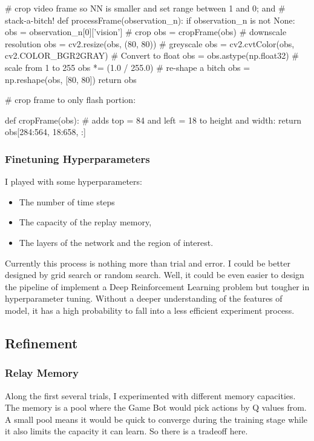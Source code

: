 \documentclass[a4paper]{article}
\begin{document}
\begin{python}
# crop video frame so NN is smaller and set range between 1 and 0; and
# stack-a-bitch!
def processFrame(observation_n):
    if observation_n is not None:
        obs = observation_n[0]['vision']
        # crop
        obs = cropFrame(obs)
        # downscale resolution
        obs = cv2.resize(obs, (80, 80))
        # greyscale
        obs = cv2.cvtColor(obs, cv2.COLOR_BGR2GRAY)
        # Convert to float
        obs = obs.astype(np.float32)
        # scale from 1 to 255
        obs *= (1.0 / 255.0)
        # re-shape a bitch
        obs = np.reshape(obs, [80, 80])
    return obs

# crop frame to only flash portion:


def cropFrame(obs):
    # adds top = 84 and left = 18 to height and width:
    return obs[284:564, 18:658, :]
\end{python}

\subsubsection{Finetuning Hyperparameters}

I played with some hyperparameters:

\begin{itemize}
\item The number of time steps
\item The capacity of the replay memory,
\item The layers of the network and the region of interest.
\end{itemize}
Currently this process is nothing more than trial and error. I could be better designed by grid search or random search. Well, it could be even easier to design the pipeline of implement a Deep Reinforcement Learning problem but tougher in hyperparameter tuning. Without a deeper understanding of the features of model, it has a high probability to fall into a less efficient experiment process. 

\subsection{Refinement}

\subsubsection{Relay Memory}
Along the first several trials, I experimented with different memory capacities. The memory is a pool where the Game Bot would pick actions by Q values from. A small pool means it would be quick to converge during the training stage while it also limits the capacity it can learn. So there is a tradeoff here.
\end{document}
